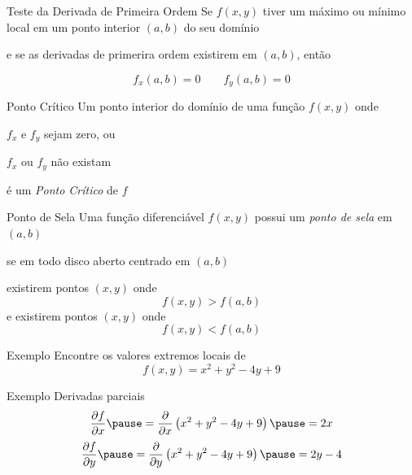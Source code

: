\begin{frame}{Teste da Derivada de Primeira Ordem}
  Se $f(x, y)$ tiver um máximo ou mínimo local em um ponto interior \((a, b)\)
  do seu domínio

  \pause
  \vspace{\baselineskip}
  e se as derivadas de primerira ordem existirem em \((a, b)\), então

  \pause
  \vspace{\baselineskip}
  \[
    f_x(a, b) = 0
    \qquad
    f_y(a, b) = 0
  \]
\end{frame}

\begin{frame}{Ponto Crítico}
  Um ponto interior do domínio de uma função \(f(x, y)\) onde

  \pause
  \vspace{\baselineskip}
  \(f_x\) e \(f_y\) sejam zero, ou

  \pause
  \vspace{\baselineskip}
  \(f_x\) ou \(f_y\) não existam

  \pause
  \vspace{\baselineskip}
  é um \emph{Ponto Crítico} de $f$
\end{frame}

\begin{frame}{Ponto de Sela}
  Uma função diferenciável \(f(x, y)\) possui um \emph{ponto de sela} em \((a, b)\)

  \pause
  \vspace{\baselineskip}
  se em todo disco aberto centrado em \((a, b)\)

  \pause
  \vspace{\baselineskip}
  existirem pontos \((x, y)\) onde
  \[
    f(x, y) > f(a, b)
  \]
  \pause
  e existirem pontos \((x, y)\) onde
  \[
    f(x, y) < f(a, b)
  \]
\end{frame}

\addtocounter{exemplo}{1}
\begin{frame}{Exemplo \theexemplo}
  Encontre os valores extremos locais de
  \[
     f(x, y) = x^2 + y^2 - 4y + 9
  \]
\end{frame}

\begin{frame}{Exemplo \theexemplo}
  Derivadas parciais
  \pause
  \vspace{\baselineskip}
  \[
    \D{f}{x}
    \pause
    = \D{}{x}\left(x^2 + y^2 - 4y + 9\right)
    \pause
    = 2x
  \]
  \pause
  \vspace{\baselineskip}
  \[
    \D{f}{y}
    \pause
    = \D{}{y}\left(x^2 + y^2 - 4y + 9\right)
    \pause
    = 2y -4
  \]
\end{frame}

